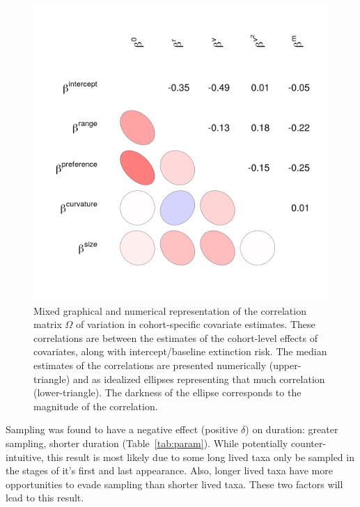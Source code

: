 \documentclass[11pt]{article}
\begin{document}
\begin{figure}[ht]
  \centering
  \includegraphics[height = 0.7\textheight,width=\textwidth,keepaspectratio=true]{figure/wei_cor_heatmap_cweib_cens}
  \caption{Mixed graphical and numerical representation of the correlation matrix \(\Omega\) of variation in cohort-specific covariate estimates. These correlations are between the estimates of the cohort-level effects of covariates, along with intercept/baseline extinction risk. The median estimates of the correlations are presented numerically (upper-triangle) and as idealized ellipses representing that much correlation (lower-triangle). The darkness of the ellipse corresponds to the magnitude of the correlation.}
  \label{fig:cor_posterior}
\end{figure}
\clearpage

Sampling was found to have a negative effect (positive \(\delta\)) on duration: greater sampling, shorter duration (Table~\ref{tab:param}). While potentially counter-intuitive, this result is most likely due to some long lived taxa only be sampled in the stages of it's first and last appearance. Also, longer lived taxa have more opportunities to evade sampling than shorter lived taxa. These two factors will lead to this result. 
\end{document}
